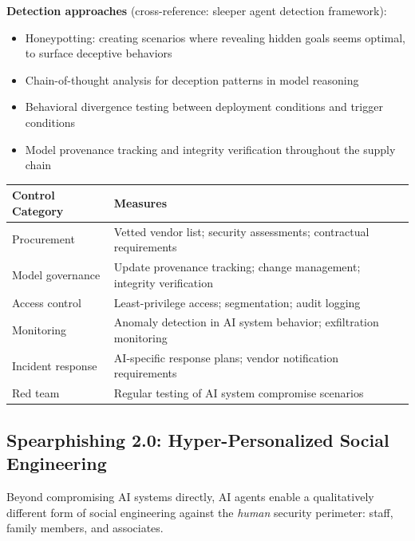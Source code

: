 \documentclass[11pt,letterpaper]{article}
\begin{document}
\textbf{Detection approaches} (cross-reference: sleeper agent detection framework):
\begin{itemize}
  \item Honeypotting: creating scenarios where revealing hidden goals seems optimal, to surface deceptive behaviors
  \item Chain-of-thought analysis for deception patterns in model reasoning
  \item Behavioral divergence testing between deployment conditions and trigger conditions
  \item Model provenance tracking and integrity verification throughout the supply chain
\end{itemize}

\begin{center}
\small
\begin{tabular}{L{3cm}L{9cm}}
\toprule
\textbf{Control Category} & \textbf{Measures} \\
\midrule
Procurement & Vetted vendor list; security assessments; contractual requirements \\
Model governance & Update provenance tracking; change management; integrity verification \\
Access control & Least-privilege access; segmentation; audit logging \\
Monitoring & Anomaly detection in AI system behavior; exfiltration monitoring \\
Incident response & AI-specific response plans; vendor notification requirements \\
Red team & Regular testing of AI system compromise scenarios \\
\bottomrule
\end{tabular}
\end{center}

\subsection{Spearphishing 2.0: Hyper-Personalized Social Engineering}

Beyond compromising AI systems directly, AI agents enable a qualitatively different form of social engineering against the \textit{human} security perimeter: staff, family members, and associates.
\end{document}
